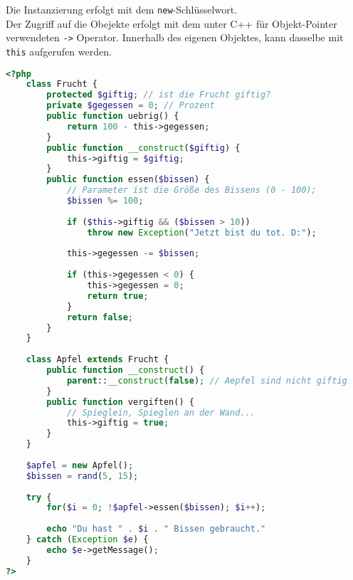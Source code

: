 Die Instanzierung erfolgt mit dem \texttt{new}-Schlüsselwort.\\
Der Zugriff auf die Obejekte erfolgt mit dem unter C++ für Objekt-Pointer verwendeten \texttt{->} Operator. Innerhalb des eigenen Objektes, kann dasselbe mit \texttt{this} aufgerufen werden.
\begin{lstlisting}[style=custom, language=PHP,  caption={Beispiel: OOP in PHP},label={lst:content_php_php}]
<?php 
	class Frucht {
		protected $giftig; // ist die Frucht giftig?
		private $gegessen = 0; // Prozent
		public function uebrig() {
			return 100 - this->gegessen;
		}
		public function __construct($giftig) {
			this->giftig = $giftig;
		}
		public function essen($bissen) {
			// Parameter ist die Größe des Bissens (0 - 100);
			$bissen %= 100; 
			
			if ($this->giftig && ($bissen > 10))
				throw new Exception("Jetzt bist du tot. D:");
				
			this->gegessen -= $bissen;
			
			if (this->gegessen < 0) {
				this->gegessen = 0;
				return true;
			}
			return false;
		}
	}
	
	class Apfel extends Frucht {
		public function __construct() {
			parent::__construct(false); // Aepfel sind nicht giftig
		}
		public function vergiften() {
			// Spieglein, Spieglen an der Wand...
			this->giftig = true;
		}
	}
	
	$apfel = new Apfel();
	$bissen = rand(5, 15);
	
	try {
		for($i = 0; !$apfel->essen($bissen); $i++);
		
		echo "Du hast " . $i . " Bissen gebraucht."
	} catch (Exception $e) {
		echo $e->getMessage();
	}
?>
\end{lstlisting}
